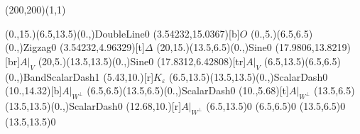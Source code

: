 \unitlength=1bp%

\begin{feynartspicture}(200,200)(1,1)

\FADiagram{}
\FAProp(0.,15.)(6.5,13.5)(0.,){DoubleLine}{0}
\FALabel(3.54232,15.0367)[b]{$O$}
\FAProp(0.,5.)(6.5,6.5)(0.,){Zigzag}{0}
\FALabel(3.54232,4.96329)[t]{$\Delta$}
\FAProp(20,15.)(13.5,6.5)(0.,){Sine}{0}
\FALabel(17.9806,13.8219)[br]{$A|_V$}
\FAProp(20,5.)(13.5,13.5)(0.,){Sine}{0}
\FALabel(17.8312,6.42808)[tr]{$A|_V$}
\FAProp(6.5,13.5)(6.5,6.5)(0.,){BandScalarDash}{1}
\FALabel(5.43,10.)[r]{$K_\varepsilon$}
\FAProp(6.5,13.5)(13.5,13.5)(0.,){ScalarDash}{0}
\FALabel(10.,14.32)[b]{$A|_{W^\perp}$}
\FAProp(6.5,6.5)(13.5,6.5)(0.,){ScalarDash}{0}
\FALabel(10.,5.68)[t]{$A|_{W^\perp}$}
\FAProp(13.5,6.5)(13.5,13.5)(0.,){ScalarDash}{0}
\FALabel(12.68,10.)[r]{$A|_{W^\perp}$}
\FAVert(6.5,13.5){0}
\FAVert(6.5,6.5){0}
\FAVert(13.5,6.5){0}
\FAVert(13.5,13.5){0}
\end{feynartspicture}

